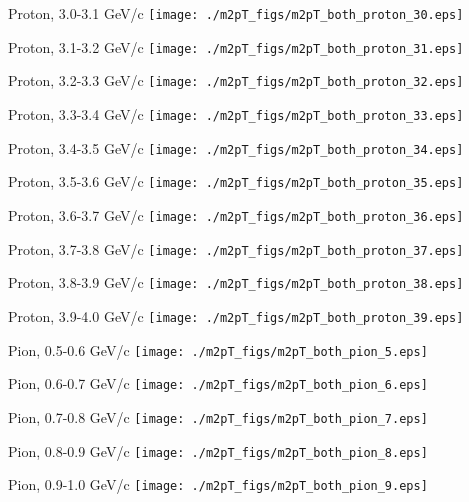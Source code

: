 \documentclass[compress]{beamer} %
\begin{document}
\begin{frame}{Proton, 3.0-3.1 GeV/c}
\texttt{[image: ./m2pT\_figs/m2pT\_both\_proton\_30.eps]}
\end{frame}
\begin{frame}{Proton, 3.1-3.2 GeV/c}
\texttt{[image: ./m2pT\_figs/m2pT\_both\_proton\_31.eps]}
\end{frame}
\begin{frame}{Proton, 3.2-3.3 GeV/c}
\texttt{[image: ./m2pT\_figs/m2pT\_both\_proton\_32.eps]}
\end{frame}
\begin{frame}{Proton, 3.3-3.4 GeV/c}
\texttt{[image: ./m2pT\_figs/m2pT\_both\_proton\_33.eps]}
\end{frame}
\begin{frame}{Proton, 3.4-3.5 GeV/c}
\texttt{[image: ./m2pT\_figs/m2pT\_both\_proton\_34.eps]}
\end{frame}
\begin{frame}{Proton, 3.5-3.6 GeV/c}
\texttt{[image: ./m2pT\_figs/m2pT\_both\_proton\_35.eps]}
\end{frame}
\begin{frame}{Proton, 3.6-3.7 GeV/c}
\texttt{[image: ./m2pT\_figs/m2pT\_both\_proton\_36.eps]}
\end{frame}
\begin{frame}{Proton, 3.7-3.8 GeV/c}
\texttt{[image: ./m2pT\_figs/m2pT\_both\_proton\_37.eps]}
\end{frame}
\begin{frame}{Proton, 3.8-3.9 GeV/c}
\texttt{[image: ./m2pT\_figs/m2pT\_both\_proton\_38.eps]}
\end{frame}
\begin{frame}{Proton, 3.9-4.0 GeV/c}
\texttt{[image: ./m2pT\_figs/m2pT\_both\_proton\_39.eps]}
\end{frame}






\begin{frame}{Pion, 0.5-0.6 GeV/c}
\texttt{[image: ./m2pT\_figs/m2pT\_both\_pion\_5.eps]}
\end{frame}
\begin{frame}{Pion, 0.6-0.7 GeV/c}
\texttt{[image: ./m2pT\_figs/m2pT\_both\_pion\_6.eps]}
\end{frame}
\begin{frame}{Pion, 0.7-0.8 GeV/c}
\texttt{[image: ./m2pT\_figs/m2pT\_both\_pion\_7.eps]}
\end{frame}
\begin{frame}{Pion, 0.8-0.9 GeV/c}
\texttt{[image: ./m2pT\_figs/m2pT\_both\_pion\_8.eps]}
\end{frame}
\begin{frame}{Pion, 0.9-1.0 GeV/c}
\texttt{[image: ./m2pT\_figs/m2pT\_both\_pion\_9.eps]}
\end{frame}
\end{document}
